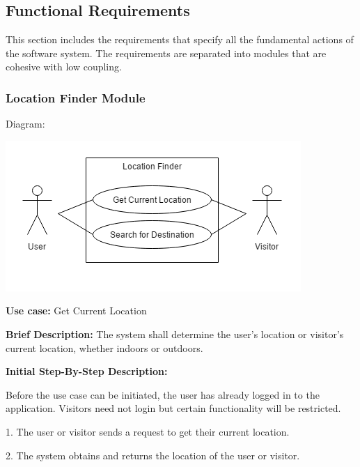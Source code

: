 \documentclass{article}
\begin{document}
    \subsection{Functional Requirements}
    This section includes the requirements that specify all the fundamental actions of the software system. The requirements are separated into modules that are cohesive with low coupling.
    \subsubsection{Location Finder Module}
    Diagram:
    	
    \includegraphics[scale=.7]{LocationFinder}
    \begin{flushleft}
    \textbf{Use case:} Get Current Location 
    \newline
    	
    \textbf{Brief Description:}
    \newline
    The system shall determine the user's location or visitor's 		current location, whether indoors or outdoors.
    \newline
    
    \textbf{Initial Step-By-Step Description:}
    
    Before the use case can be initiated, the user has already logged in to the application. Visitors need not login but certain functionality will be restricted.
	\newline    
	
1. The user or visitor sends a request to get their current location.
    
2. The system obtains and returns the location of the user or visitor.
\end{flushleft}
\end{document}
